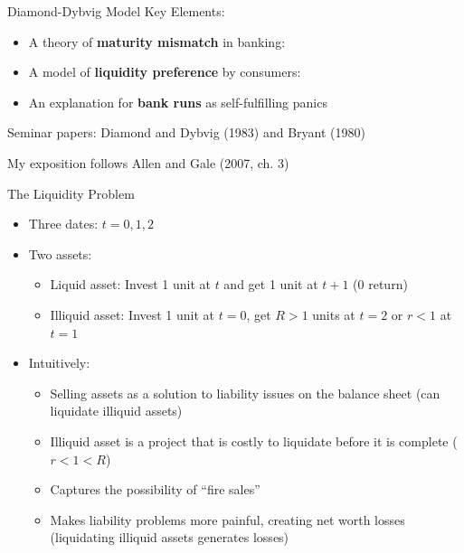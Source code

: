\documentclass[11pt,aspectratio=169,xcolor={dvipsnames},hyperref={pdftex,pdfpagemode=UseNone,hidelinks,pdfdisplaydoctitle=true},usepdftitle=false]{beamer}
\begin{document}
\begin{frame}{Diamond-Dybvig Model}
Key Elements:
\begin{itemize}
	\itemsep1em 
	\item A theory of \textbf{maturity mismatch} in banking: {\color{gray}{banks lend long duration, borrow short duration}}
	\item A model of \textbf{liquidity preference} by consumers: {\color{gray}{Some consumers prefer callable deposits}}
	\item An explanation for \textbf{bank runs} as self-fulfilling panics 
\end{itemize}
\vspace{15pt}
{\small Seminar papers: Diamond and Dybvig (1983) and Bryant (1980)}

\vspace{10pt}
{\small My exposition follows Allen and Gale (2007, ch. 3)}
\end{frame}



\begin{frame}{The Liquidity Problem}
\begin{itemize}
	\itemsep1em 
	\item Three dates: $t = 0, 1, 2$
	\item Two assets:
	\begin{itemize}
		\item Liquid asset: Invest 1 unit at $t$ and get 1 unit at $t+1$ (0 return)
		\item Illiquid asset: Invest 1 unit at $t=0$, get $R>1$ units at $t=2$ or $r<1$ at $t=1$ 
	\end{itemize}
	\item Intuitively:
	\begin{itemize}
		\item Selling assets as a solution to liability issues on the balance sheet (can liquidate illiquid assets)
		\item Illiquid asset is a project that is costly to liquidate before it is complete ($r< 1 < R$)
		\item Captures the possibility of ``fire sales''
		\item Makes liability problems more painful, creating net worth losses (liquidating illiquid assets generates losses)
	\end{itemize} 
\end{itemize}
\end{frame}
\end{document}
